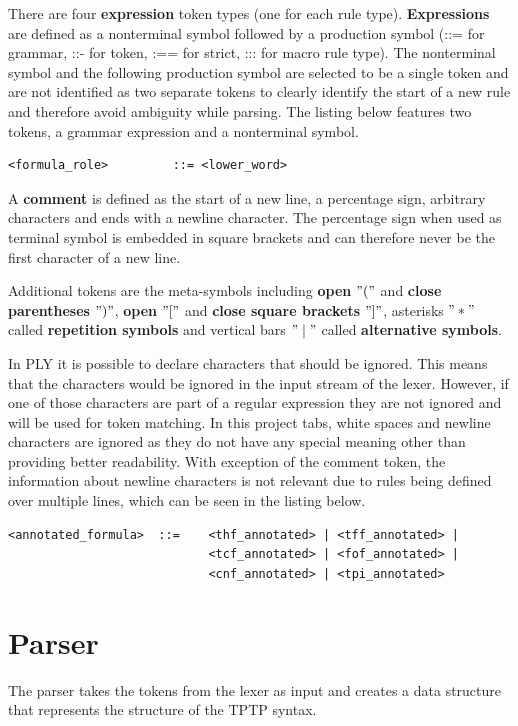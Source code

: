 There are four \textbf{expression} token types (one for each rule type).
\textbf{Expressions} are defined as a nonterminal symbol followed by a production symbol (::= for grammar, ::- for token, :== for strict, ::: for macro rule type).
The nonterminal symbol and the following production symbol are selected to be a single token and are not identified as two separate tokens to clearly identify the start of a new rule and therefore avoid ambiguity while parsing.
The listing below features two tokens, a grammar expression and a nonterminal symbol.
\begin{lstlisting}[caption= Rule example]
<formula_role>         ::= <lower_word>
\end{lstlisting}

A \textbf{comment} is defined as the start of a new line, a percentage sign, arbitrary characters and ends with a newline character.
The percentage sign when used as terminal symbol is embedded in square brackets and can therefore never be the first character of a new line.

Additional tokens are the meta-symbols including \textbf{open} $"("$ and \textbf{close parentheses} $")"$, \textbf{open} $"["$ and \textbf{close square brackets} $"]"$, asterisks $"*"$ called \textbf{repetition symbols} and vertical bars $"\mid"$ called \textbf{alternative symbols}.

In PLY it is possible to declare characters that should be ignored. This means that the characters would be ignored in the input stream of the lexer. However, if one of those characters are part of a regular expression they are not ignored and will be used for token matching. In this project tabs, white spaces and newline characters are ignored as they do not have any special meaning other than providing better readability. With exception of the comment token, the information about newline characters is not relevant due to rules being defined over multiple lines, which can be seen in the listing below.
\begin{lstlisting}[caption= Example of rules defined over multiple lines]
<annotated_formula>  ::=    <thf_annotated> | <tff_annotated> |
                            <tcf_annotated> | <fof_annotated> |
                            <cnf_annotated> | <tpi_annotated>
\end{lstlisting}

\section{Parser}\label{sec:ConceptParser}
The parser takes the tokens from the lexer as input and creates a data structure that represents the structure of the \ac{TPTP} syntax.

